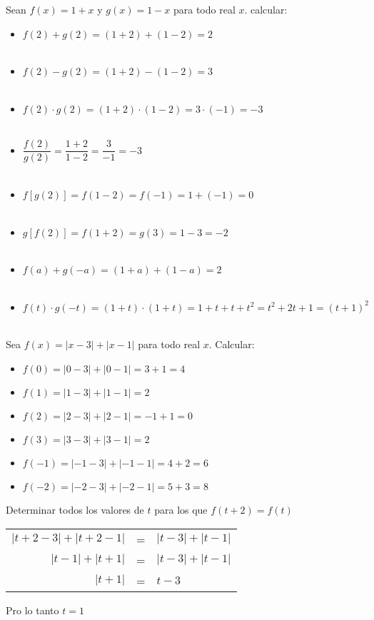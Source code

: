 \begin{ej}
Sean $f(x)= 1+x$ \; y \; $g(x)=1-x$ para todo real $x$. calcular:
\begin{itemize}
\item $f(2)+g(2) = (1+2) + (1-2) = 2$\\\\
\item $f(2)-g(2) = (1+2) - (1-2) = 3$\\\\
\item $f(2)\cdot g(2) = (1+2) \cdot (1-2) = 3 \cdot (-1) = -3$\\\\
\item $\dfrac{f(2)}{g(2)}= \dfrac{1+2}{1-2} = \dfrac{3}{-1} = -3$\\\\
\item $f\left[ g(2)\right] = f(1-2) = f(-1) = 1+(-1)= 0$\\\\
\item $g\left[ f(2)\right] = f(1+2) = g(3) = 1 - 3 = -2$\\\\
\item $f(a) + g(-a) = (1+a) + (1 - a) = 2$\\\\
\item $f(t)\cdot g(-t) = (1+t) \cdot (1+t) = 1 + t + t + t^2 = t^2 +2t + 1 = (t+1)^2$\\\\
\end{itemize}
\end{ej}

\begin{ej}
Sea $f(x)=|x-3|+|x-1|$ para todo real $x$. Calcular:\\
\begin{itemize}
\item $f(0) = |0-3|+|0-1| = 3 + 1 = 4$
\item $f(1) = |1-3|+|1-1| = 2$
\item $f(2) = |2-3|+|2-1| = -1 + 1 = 0$
\item $f(3) = |3-3|+|3-1| = 2$
\item $f(-1) = |-1-3|+|-1-1| = 4 + 2 = 6$
\item $f(-2) = |-2-3|+|-2-1| = 5 + 3 = 8$\\
\end{itemize}
Determinar todos los valores de $t$ para los que $f(t+2)=f(t)$\\
\begin{center}
\begin{tabular}{r c l}
$|t+2-3| + |t+2-1|$&=&$|t-3| + |t-1|$\\
$|t-1|+|t+1|$&=&$|t-3|+|t-1|$\\
$|t+1|$&=&$t-3$\\
\end{tabular}
\end{center}
Pro lo tanto  $t=1$\\\\
\end{ej}

